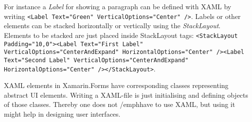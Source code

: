 \documentclass[conference]{IEEEtran}
\newcommand{\code}[1]{\texttt{#1}}
\begin{document}
For instance a \emph{Label} for showing a paragraph can be defined with XAML by writing \code{<Label Text="Green" VerticalOptions="Center" />}. Labels or other elements can be stacked horizontally or vertically using the \emph{StackLayout}. Elements to be stacked are just placed inside StackLayout tags: \code{<StackLayout Padding="10,0"><Label Text="First Label" VerticalOptions="CenterAndExpand" HorizontalOptions="Center" /><Label Text="Second Label" VerticalOptions="CenterAndExpand" HorizontalOptions="Center" /></StackLayout>}.

XAML elements in Xamarin.Forms have corresponding classes representing abstract UI elements. Writing a XAML-file is just initialising and defining objects of those classes. Thereby one does not /emph{have to} use XAML, but using it might help in designing user interfaces.

\nocite{xamarin}
\nocite{xamarin2}
\nocite{xamarin3}


\end{document}
